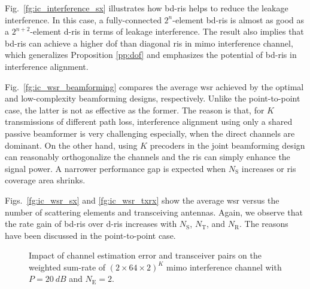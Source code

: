 \documentclass[
	fontsize=11pt,
	paper=a4,
	foldmarks=false
]{scrartcl}
\begin{document}
\begin{reviewer}
{{			Fig.~\ref{fg:ic_interference_sx} illustrates how \gls{bd}-\gls{ris} helps to reduce the leakage interference.
			In this case, a fully-connected $2^n$-element \gls{bd}-\gls{ris} is almost as good as a $2^{n+2}$-element \gls{d}-\gls{ris} in terms of leakage interference.
			The result also implies that \gls{bd}-\gls{ris} can achieve a higher \gls{dof} than diagonal \gls{ris} in \gls{mimo} interference channel, which generalizes Proposition \ref{pp:dof} and emphasizes the potential of \gls{bd}-\gls{ris} in interference alignment.

			Fig.~\ref{fg:ic_wsr_beamforming} compares the average \gls{wsr} achieved by the optimal and low-complexity beamforming designs, respectively.
			Unlike the point-to-point case, the latter is not as effective as the former.
			The reason is that, for $K$ transmissions of different path loss, interference alignment using only a shared passive beamformer is very challenging especially, when the direct channels are dominant.
			On the other hand, using $K$ precoders in the joint beamforming design can reasonably orthogonalize the channels and the \gls{ris} can simply enhance the signal power.
			A narrower performance gap is expected when $N_\mathrm{S}$ increases or \gls{ris} coverage area shrinks.

			Figs.~\ref{fg:ic_wsr_sx} and \ref{fg:ic_wsr_txrx} show the average \gls{wsr} versus the number of scattering elements and transceiving antennas.
			Again, we observe that the rate gain of \gls{bd}-\gls{ris} over \gls{d}-\gls{ris} increases with $N_\mathrm{S}$, $N_\mathrm{T}$, and $N_\mathrm{R}$.
			The reasons have been discussed in the point-to-point case.

			\begin{figure}[H]
				\centering
				\resizebox{!}{5cm}{
					
				}
				\caption{Impact of channel estimation error and transceiver pairs on the weighted sum-rate of $(2 \times 64 \times 2)^K$ \gls{mimo} interference channel with $P = \qty{20}{dB}$ and $N_\mathrm{E} = 2$.
				}
				\label{fg:ic_wsr_pair}
			\end{figure}

}}
\end{reviewer}
\end{document}
